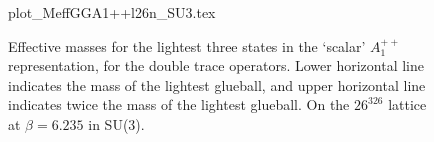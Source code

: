 \documentclass[12pt]{article}
\begin{document}
\begin{figure}[htb]
\begin	{center}
\leavevmode
	{plot_MeffGGA1++l26n_SU3.tex}
\end	{center}
\caption{Effective masses for the lightest three states
  in the `scalar' $A_1^{++}$ representation, for the double trace operators.
  Lower horizontal line indicates the mass of the lightest glueball, and
  upper  horizontal line indicates twice the mass of the lightest glueball.
  On the $26^326$ lattice at $\beta=6.235$ in SU(3).}
\label{fig_MeffGGA1++l26n_SU3}
\end{figure}











\end{document}

